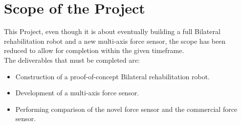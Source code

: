 \section{Scope of the Project}\label{scope}
This Project, even though it is about eventually building a full Bilateral rehabilitation robot and a new multi-axis force sensor, the scope has been reduced to allow for completion within the given timeframe.\\
The deliverables that must be completed are:
\begin{itemize}
	\item Construction of a proof-of-concept Bilateral rehabilitation robot.
	\item Development of a multi-axis force sensor.
	\item Performing comparison of the novel force sensor and the commercial force sensor.
\end{itemize}


